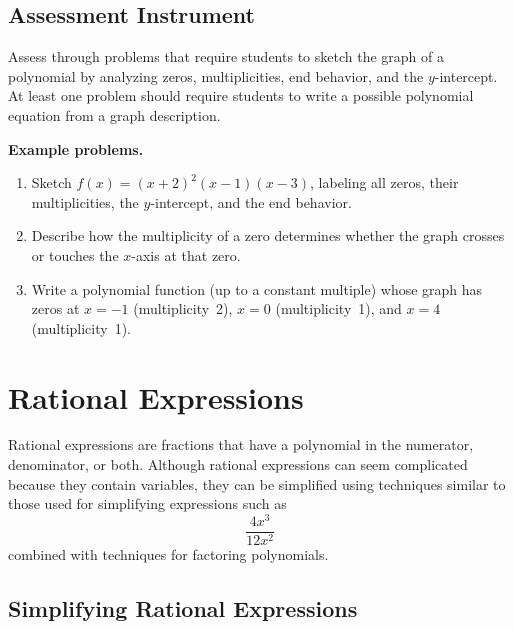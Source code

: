 \subsection{Assessment Instrument}
\label{ssec:asse-9c9d}

Assess through problems that require students to sketch the graph of a polynomial by
analyzing zeros, multiplicities, end behavior, and the $y$-intercept. At least one problem
should require students to write a possible polynomial equation from a graph description.

\textbf{Example problems.}

\begin{enumerate}
    \item Sketch $f(x) = (x + 2)^2(x - 1)(x - 3)$, labeling all zeros, their multiplicities, the $y$-intercept, and the end behavior.
    \item Describe how the multiplicity of a zero determines whether the graph crosses or touches the $x$-axis at that zero.
    \item Write a polynomial function (up to a constant multiple) whose graph has zeros at $x = -1$ (multiplicity~2), $x = 0$ (multiplicity~1), and $x = 4$ (multiplicity~1).
\end{enumerate}

\section{Rational Expressions}
\label{sec:rati-e460}

Rational expressions are fractions that have a polynomial in the numerator, denominator,
or both. Although rational expressions can seem complicated because they contain
variables, they can be simplified using techniques similar to those used for simplifying
expressions such as
\[
\frac{4x^3}{12x^2}
\]
combined with techniques for factoring polynomials.

\subsection{Simplifying Rational Expressions}
\label{sss:simp-4e69}

